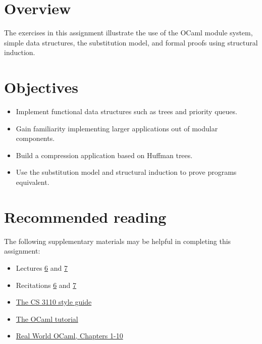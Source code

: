 \documentclass{pset}
\date{Due: March 6}
\begin{document}
\maketitle

\section*{Overview}

The exercises in this assignment illustrate the use of the OCaml
module system, simple data structures, the substitution model, and
formal proofs using structural induction.

\section*{Objectives}
\begin{itemize}
\item Implement functional data structures such as trees and priority
  queues.
\item Gain familiarity implementing larger applications out of modular
  components.
\item Build a compression application based on Huffman trees.
\item Use the substitution model and structural induction to prove
  programs equivalent.
\end{itemize}

\section*{Recommended reading}

The following supplementary materials may be helpful in completing
this assignment:
\begin{itemize}
\item{} Lectures
    \href{http://www.cs.cornell.edu/Courses/cs3110/2014sp/lectures/6/substitution-model-of-evaluation.html}{6} and
    \href{http://www.cs.cornell.edu/Courses/cs3110/2014sp/lectures/7/modular-programming.html}{7}
\item{} Recitations 
  \href{http://www.cs.cornell.edu/Courses/cs3110/2014sp/recitations/6/more-on-the-substitution-model.html}{6} and
  \href{http://www.cs.cornell.edu/Courses/cs3110/2014sp/recitations/7/functional-stacks-queues-dictionaries-fractions.html}{7}
\item{} \href{http://www.cs.cornell.edu/Courses/cs3110/2014sp/handouts/style.html}{The CS 3110 style guide}
\item{} \href{http://ocaml.org/learn/tutorials/}{The OCaml tutorial}
\item{} \href{https://realworldocaml.org/v1/en/html/index.html}{Real World OCaml, Chapters 1-10}
\end{itemize}
\end{document}
